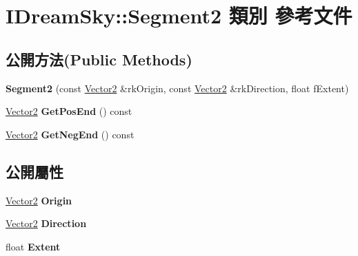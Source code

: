 \hypertarget{class_i_dream_sky_1_1_segment2}{}\section{I\+Dream\+Sky\+:\+:Segment2 類別 參考文件}
\label{class_i_dream_sky_1_1_segment2}
\subsection*{公開方法(Public Methods)}
\begin{DoxyCompactItemize}
\item 
{\bfseries Segment2} (const \hyperlink{class_i_dream_sky_1_1_vector2}{Vector2} \&rk\+Origin, const \hyperlink{class_i_dream_sky_1_1_vector2}{Vector2} \&rk\+Direction, float f\+Extent)\hypertarget{class_i_dream_sky_1_1_segment2_a9f2bbd8eab2eb74cbb989ad7d40281f7}{}\label{class_i_dream_sky_1_1_segment2_a9f2bbd8eab2eb74cbb989ad7d40281f7}

\item 
\hyperlink{class_i_dream_sky_1_1_vector2}{Vector2} {\bfseries Get\+Pos\+End} () const \hypertarget{class_i_dream_sky_1_1_segment2_a3cbb2227f356f5a809b6fe7a8b4fe7aa}{}\label{class_i_dream_sky_1_1_segment2_a3cbb2227f356f5a809b6fe7a8b4fe7aa}

\item 
\hyperlink{class_i_dream_sky_1_1_vector2}{Vector2} {\bfseries Get\+Neg\+End} () const \hypertarget{class_i_dream_sky_1_1_segment2_af28b1af7a04cc0eb5d00f48171993239}{}\label{class_i_dream_sky_1_1_segment2_af28b1af7a04cc0eb5d00f48171993239}

\end{DoxyCompactItemize}
\subsection*{公開屬性}
\begin{DoxyCompactItemize}
\item 
\hyperlink{class_i_dream_sky_1_1_vector2}{Vector2} {\bfseries Origin}\hypertarget{class_i_dream_sky_1_1_segment2_ae1ec5f317ccf858c2b71546dfdd114bd}{}\label{class_i_dream_sky_1_1_segment2_ae1ec5f317ccf858c2b71546dfdd114bd}

\item 
\hyperlink{class_i_dream_sky_1_1_vector2}{Vector2} {\bfseries Direction}\hypertarget{class_i_dream_sky_1_1_segment2_aa39d203bb7ca348cc0dffc54443d0a19}{}\label{class_i_dream_sky_1_1_segment2_aa39d203bb7ca348cc0dffc54443d0a19}

\item 
float {\bfseries Extent}\hypertarget{class_i_dream_sky_1_1_segment2_a0bd488021114e3c971ef9c0fe1e672be}{}\label{class_i_dream_sky_1_1_segment2_a0bd488021114e3c971ef9c0fe1e672be}

\end{DoxyCompactItemize}



